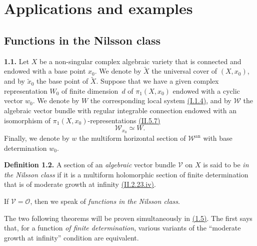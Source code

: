 \documentclass{report}
\newenvironment{rmenv}[1]
  {\phantomsection\par\medskip\noindent\textbf{#1.}\rmfamily}
  {\medskip}
\newcommand{\scr}[1]{{\mathscr{#1}}}
\renewcommand{\cal}[1]{{\mathcal{#1}}}
\newcommand{\an}{\mathrm{an}}
\newcommand{\oldpage}[1]{\marginpar{\footnotesize$\Big\vert$ \textit{p.~#1}}}
\begin{document}
\chapter{Applications and examples}
\label{III}


\section{Functions in the Nilsson class}
\label{III.1}

\begin{rmenv}{1.1}
\label{III.1.1}
\oldpage{122}
  Let $X$ be a non-singular complex algebraic variety that is connected and endowed with a base point $x_0$.
  We denote by $\widetilde{X}$ the universal cover of $(X,x_0)$, and by $\widetilde{x}_0$ the base point of $\widetilde{X}$.
  Suppose that we have a given complex representation $W_0$ of finite dimension~$d$ of $\pi_1(X,x_0)$ endowed with a cyclic vector $w_0$.
  We denote by $W$ the corresponding local system \hyperref[I.1.4]{(I.1.4)}, and by $\scr{W}$ the algebraic vector bundle with regular integrable connection endowed with an isomorphism of $\pi_1(X,x_0)$-representations \hyperref[II.5.7]{(II.5.7)}
  \[
    \scr{W}_{x_0} \simeq W.
  \]
  Finally, we denote by $w$ the multiform horizontal section of $\scr{W}^\an$ with base determination $w_0$.
\end{rmenv}

\begin{rmenv}{Definition 1.2}
\label{III.1.2}
  A section of an \emph{algebraic} vector bundle $\cal{V}$ on $X$ is said to be \emph{in the Nilsson class} if it is a multiform holomorphic section of finite determination that is of moderate growth at infinity \hyperref[II.2.23]{(II.2.23.iv)}.

  If $\cal{V}=\cal{O}$, then we speak of \emph{functions in the Nilsson class}.
\end{rmenv}

The two following theorems will be proven simultaneously in \hyperref[III.1.5proof]{(1.5)}.
The first says that, for a function \emph{of finite determination}, various variants of the ``moderate growth at infinity'' condition are equivalent.
\end{document}
